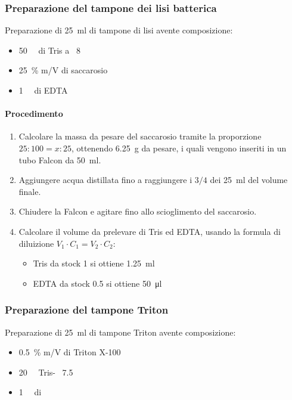 \subsubsection{Preparazione del tampone dei lisi batterica}
\noindent Preparazione di \qty{25}{\ml} di tampone di lisi avente composizione:
\begin{itemize}[person]
	\item \qty{50}{\milli\Molar} di Tris a \pH\ 8
	\item \qty{25}{\percent} m/V di saccarosio
	\item \qty{1}{\milli\Molar} di EDTA
\end{itemize}

\paragraph{Procedimento}
\begin{enumerate}
	\item Calcolare la massa da pesare del saccarosio tramite la proporzione \(25:100=x:25\), ottenendo \qty{6.25}{\g} da pesare, i quali vengono inseriti in un tubo Falcon da \qty{50}{\ml}.
	\item Aggiungere acqua distillata fino a raggiungere i \(3/4\) dei \qty{25}{\ml} del volume finale.
	\item Chiudere la Falcon e agitare fino allo scioglimento del saccarosio.
	\item Calcolare il volume da prelevare di Tris ed EDTA, usando la formula di diluizione \mbox{\(V_1\cdot C_1 = V_2\cdot C_2\)}:
	\begin{itemize}[person]
		\item Tris da stock \qty{1}{\Molar} si ottiene \qty{1.25}{\ml}
		\item EDTA da stock \qty{0.5}{\Molar} si ottiene \qty{50}{\micro\litre}
	\end{itemize}
\end{enumerate}

\subsubsection{Preparazione del tampone Triton}
\noindent Preparazione di \qty{25}{\ml} di tampone Triton avente composizione:
\begin{itemize}[person]
	\item \qty{0.5}{\percent} m/V di Triton X-100
	\item \qty{20}{\milli\Molar} Tris- \pH\ \num{7.5}
	\item \qty{1}{\milli\Molar} di 
\end{itemize}

